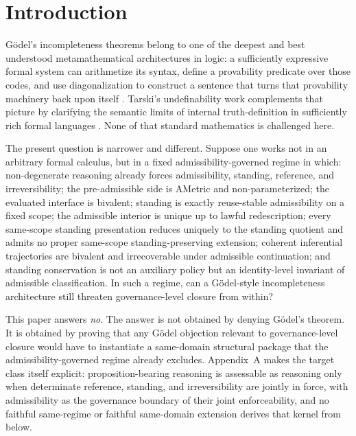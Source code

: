 \documentclass[11pt]{article}
\theoremstyle{plain}
\theoremstyle{definition}
\begin{document}
\tableofcontents

\section{Introduction}

G\"odel's incompleteness theorems belong to one of the deepest and best understood metamathematical architectures in logic: a sufficiently expressive formal system can arithmetize its syntax, define a provability predicate over those codes, and use diagonalization to construct a sentence that turns that provability machinery back upon itself \citep{Goedel1931}. Tarski's undefinability work complements that picture by clarifying the semantic limits of internal truth-definition in sufficiently rich formal languages \citep{Tarski1936,Tarski1956}. None of that standard mathematics is challenged here.

The present question is narrower and different. Suppose one works not in an arbitrary formal calculus, but in a fixed admissibility-governed regime in which: non-degenerate reasoning already forces admissibility, standing, reference, and irreversibility; the pre-admissible side is AMetric and non-parameterized; the evaluated interface is bivalent; standing is exactly reuse-stable admissibility on a fixed scope; the admissible interior is unique up to lawful redescription; every same-scope standing presentation reduces uniquely to the standing quotient and admits no proper same-scope standing-preserving extension; coherent inferential trajectories are bivalent and irrecoverable under admissible continuation; and standing conservation is not an auxiliary policy but an identity-level invariant of admissible classification. In such a regime, can a G\"odel-style incompleteness architecture still threaten governance-level closure from within?

This paper answers \emph{no}. The answer is not obtained by denying G\"odel's theorem. It is obtained by proving that any G\"odel objection relevant to governance-level closure would have to instantiate a same-domain structural package that the admissibility-governed regime already excludes. Appendix~A makes the target class itself explicit: proposition-bearing reasoning is assessable as reasoning only when determinate reference, standing, and irreversibility are jointly in force, with admissibility as the governance boundary of their joint enforceability, and no faithful same-regime or faithful same-domain extension derives that kernel from below.
\end{document}
